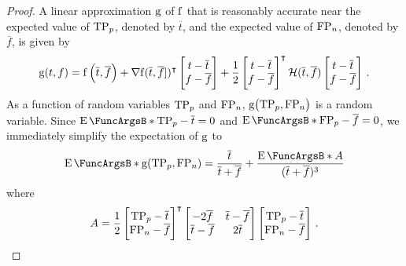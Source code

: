 \documentclass[10pt,final,hidelinks]{article}
\numberwithin{equation}{section}
\begin{document}
{\begin{proof}
A linear approximation $\Fun{g}$ of $\Fun{f}$ that is reasonably accurate near the expected value of $\mathrm{TP}_p$, denoted by $\overline{t}$, and the expected value of $\mathrm{FP}_n$, denoted by $\overline{f}$, is given by
\begin{equation}
    \Fun{g}(t,f) =
    \Fun{f}\left(\overline{t},\overline{f}\right) + \nabla{\Fun{f}}(\overline{t},\overline{f}])^{\intercal}
    \begin{bmatrix}
        t - \overline{t}\\
        f - \overline{f}\\
    \end{bmatrix}
    + \frac{1}{2}
    \begin{bmatrix}
        t - \overline{t}\\
        f - \overline{f}\\
    \end{bmatrix}^{\intercal}
    \mathcal{H}(\overline{t},\overline{f})
    \begin{bmatrix}
        t - \overline{t}\\
        f - \overline{f}\\
    \end{bmatrix}\,.
\end{equation}
As a function of random variables $\mathrm{TP}_p$ and $\mathrm{FP}_n$, $\Fun{g}\!\left(\TP_p,\FP_n\right)$ is a random variable.
Since $\Expect{\TP_p - \overline{t}} = 0$ and $\Expect{\FP_p - \overline{f}} = 0$, we immediately simplify the expectation of $\Fun{g}$ to
\begin{equation}
\label{eq:proof_hess1}
    \Expect{\Fun{g}(\TP_p,\FP_n)} = \frac{\overline{t}}{\overline{t}+\overline{f}} + \frac{\Expect{A}}{(\overline{t} + \overline{f})^3}
\end{equation}
where
\begin{equation}
    A = \frac{1}{2}
    \begin{bmatrix}
        \TP_p - \overline{t}\\
        \FP_n - \overline{f}
    \end{bmatrix}^{\intercal}
    \begin{bmatrix}
        -2 \overline{f} & \overline{t}-\overline{f}\\
        \overline{t}-\overline{f} & 2 \overline{t}
    \end{bmatrix}
    \begin{bmatrix}
        \TP_p - \overline{t}\\
        \FP_n - \overline{f}
    \end{bmatrix}\,.

\end{equation}
\end{proof}}
\end{document}
